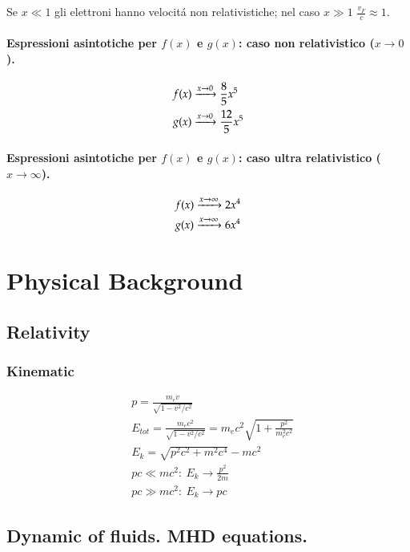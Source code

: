 \documentclass[main.tex]{subfiles}
\begin{document}
Se $x\ll1$ gli elettroni hanno velocit\'a non relativistiche; nel caso $x\gg1$ $\frac{v_F}{c}\approx1$.

\subsection{Espressioni asintotiche per $f(x)$ e $g(x)$: caso non relativistico ($x\to0$).}

\begin{align*}
&f(x)\xrightarrow{x\to0}\frac{8}{5}x^5\\
&g(x)\xrightarrow{x\to0}\frac{12}{5}x^5
\end{align*}

\subsection{Espressioni asintotiche per $f(x)$ e $g(x)$: caso ultra relativistico ($x\to\infty$).}

\begin{align*}
&f(x)\xrightarrow{x\to\infty}2x^4\\
&g(x)\xrightarrow{x\to\infty}6x^4
\end{align*}

\part{Physical Background}


\chapter{Relativity}
\PartialToc

\section{Kinematic}

\begin{align*}
&p=\frac{m_ev}{\sqrt{1-v^2/c^2}}\\
&E_{tot}=\frac{m_ec^2}{\sqrt{1-v^2/c^2}}=m_ec^2\sqrt{1+\frac{p^2}{m_e^2c^2}}\\
&E_k=\sqrt{p^2c^2+m^2c^4}-mc^2\\
&pc\ll mc^2:\ E_k\to\frac{p^2}{2m}\\
&pc\gg mc^2:\ E_k\to pc
\end{align*}


\chapter{Dynamic of fluids. MHD equations.}
\PartialToc
\end{document}
